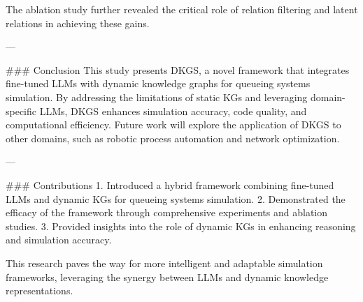 The ablation study further revealed the critical role of relation filtering and latent relations in achieving these gains.  

---

### Conclusion  
This study presents DKGS, a novel framework that integrates fine-tuned LLMs with dynamic knowledge graphs for queueing systems simulation. By addressing the limitations of static KGs and leveraging domain-specific LLMs, DKGS enhances simulation accuracy, code quality, and computational efficiency. Future work will explore the application of DKGS to other domains, such as robotic process automation and network optimization.  

---

### Contributions  
1. Introduced a hybrid framework combining fine-tuned LLMs and dynamic KGs for queueing systems simulation.  
2. Demonstrated the efficacy of the framework through comprehensive experiments and ablation studies.  
3. Provided insights into the role of dynamic KGs in enhancing reasoning and simulation accuracy.  

This research paves the way for more intelligent and adaptable simulation frameworks, leveraging the synergy between LLMs and dynamic knowledge representations.